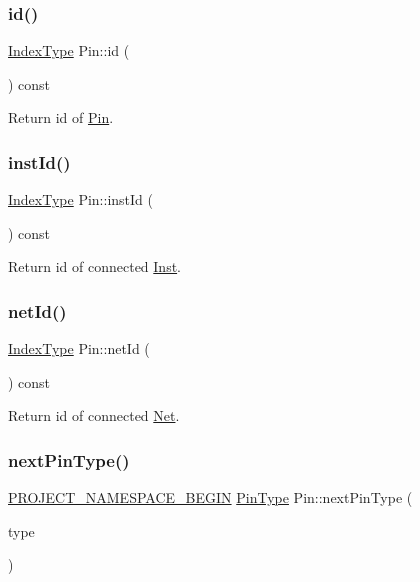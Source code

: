 \subsubsection{\texorpdfstring{id()}{id()}}
{\footnotesize\ttfamily \hyperlink{type_8h_a581e8093e28e7362f2b6937296190676}{Index\+Type} Pin\+::id (\begin{DoxyParamCaption}{ }\end{DoxyParamCaption}) const\hspace{0.3cm}{\ttfamily [inline]}}

Return id of \hyperlink{classPin}{Pin}. \mbox{\label{classPin_a8ddc3b130a28cbc1781b155dea8c333e}} 
\subsubsection{\texorpdfstring{inst\+Id()}{instId()}}
{\footnotesize\ttfamily \hyperlink{type_8h_a581e8093e28e7362f2b6937296190676}{Index\+Type} Pin\+::inst\+Id (\begin{DoxyParamCaption}{ }\end{DoxyParamCaption}) const\hspace{0.3cm}{\ttfamily [inline]}}

Return id of connected \hyperlink{classInst}{Inst}. \mbox{\label{classPin_a5bcc2c816d52b915690738820c4042b3}} 
\subsubsection{\texorpdfstring{net\+Id()}{netId()}}
{\footnotesize\ttfamily \hyperlink{type_8h_a581e8093e28e7362f2b6937296190676}{Index\+Type} Pin\+::net\+Id (\begin{DoxyParamCaption}{ }\end{DoxyParamCaption}) const\hspace{0.3cm}{\ttfamily [inline]}}

Return id of connected \hyperlink{classNet}{Net}. \mbox{\label{classPin_a86313ccf5cf94894c0d6cece183cb25d}} 
\subsubsection{\texorpdfstring{next\+Pin\+Type()}{nextPinType()}}
{\footnotesize\ttfamily \hyperlink{namespace_8h_ae48726a24dab2034454cf6d79e531eb8}{P\+R\+O\+J\+E\+C\+T\+\_\+\+N\+A\+M\+E\+S\+P\+A\+C\+E\+\_\+\+B\+E\+G\+IN} \hyperlink{type_8h_afaab50027002ecbb6c8ac27e727d1bb4}{Pin\+Type} Pin\+::next\+Pin\+Type (\begin{DoxyParamCaption}\item[{\hyperlink{type_8h_afaab50027002ecbb6c8ac27e727d1bb4}{Pin\+Type}}]{type }\end{DoxyParamCaption})\hspace{0.3cm}{\ttfamily [static]}}



